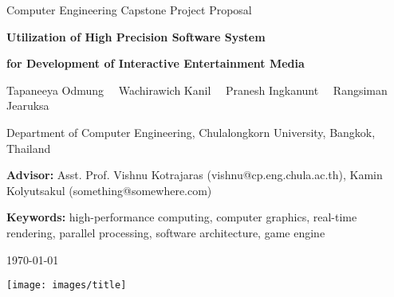 \noindent
{\footnotesize
Computer Engineering Capstone Project Proposal
\par}

\vspace{0.3cm}

\noindent
{\Large\bfseries
Utilization of High Precision Software System
\par}

\noindent
{\Large\bfseries
for Development of Interactive Entertainment Media
\par}

\vspace{0.4cm}

\noindent
{\small
Tapaneeya Odmung   \, \textbar \,
Wachirawich Kanil  \, \textbar \,
Pranesh Ingkanunt  \, \textbar \,
Rangsiman Jearuksa
\par}

\vspace{0.3cm}

\noindent
{\scriptsize
Department of Computer Engineering, Chulalongkorn University, Bangkok, Thailand
\par}

\vspace{0.3cm}

\noindent
{\scriptsize
\textbf{Advisor:}
Asst. Prof. Vishnu Kotrajaras (vishnu@cp.eng.chula.ac.th),
Kamin Kolyutsakul (something@somewhere.com)
\par}

\vspace{0.3cm}

\noindent
{\scriptsize
\textbf{Keywords:}
high-performance computing,
computer graphics,
real-time rendering,
parallel processing,
software architecture,
game engine
\par}

\vspace{0.3cm}

\noindent
{\normalsize \today \par}

\vspace{0.5cm}

\begin{center}
    \texttt{[image: images/title]}
\end{center}

